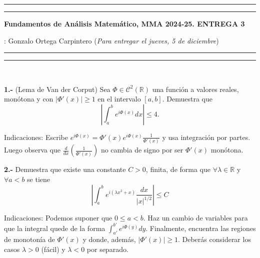 \documentclass[11pt,a4paper]{article}
\begin{document}
\hrule\hrule
\vspace{2mm}

{\bf Fundamentos de Análisis Matemático, MMA 2024-25.
\hfill{ENTREGA 3}}

\vspace{3mm}

 : Gonzalo Ortega Carpintero \hfill ({\small \it Para entregar el jueves, 5 de diciembre})

\vspace{2mm}

\hrule\hrule

\vspace{2mm}

\

{\bf 1.-} (Lema de Van der Corput) Sea $\Phi\in\mathcal{C}^2(\mathbb R)$ una función a valores reales, monótona y con $|\Phi'(x)|\ge 1$ en el intervalo $[a,b]$. Demuestra que
$$
\left|\int_a^b e^{i\Phi(x)}dx\right|\le 4. 
$$

 \vskip -1mm

{\sc Indicaciones}: Escribe $e^{i\Phi(x)}=\Phi'(x)e^{i\Phi(x)}\frac 1{\Phi'(x)}$ y usa integración por partes. Luego observa que $\frac d{dx}\left(\frac 1{\Phi'(x)}\right)$ no cambia de signo por ser $\Phi'(x)$ monótona. 

\vskip 8mm 

{\bf 2.-} Demuestra que existe una constante $C>0$, finita, de forma que $\forall \lambda\in \mathbb R$ y $\forall a<b$ se tiene
$$
\left|\int_a^b e^{i(\lambda x^2+x)}\frac{dx}{|x|^{1/2}}\right|\le C
$$
 \vskip -1mm

{\sc Indicaciones}: Podemos suponer que $0 \le a <b$. Haz un cambio de variables para que la integral quede de la forma $\displaystyle \int_{a'}^{b'} e^{i\Phi(y)}dy$. Finalmente, encuentra las regiones de monotonía de $\Phi'(x)$ y donde, además, $|\Phi'(x)|\ge 1$. Deberás considerar los casos $\lambda>0$ (fácil) y $  \lambda<0$ por separado. 
\vskip 1cm 

 
 
\end{document}
